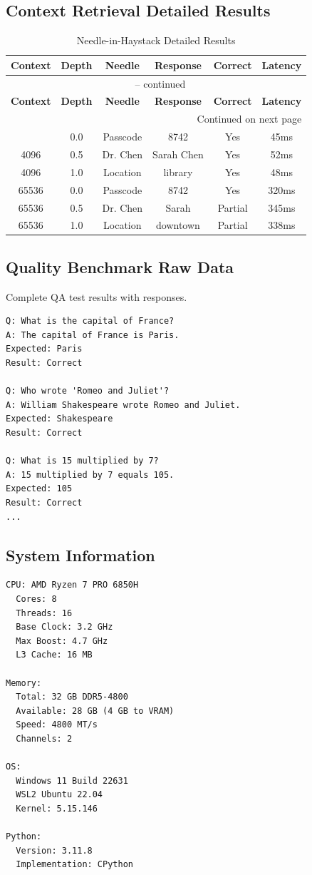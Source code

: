 \subsection{Context Retrieval Detailed Results}

\begin{longtable}{cccccc}
\caption{Needle-in-Haystack Detailed Results} \\
\toprule
\textbf{Context} & \textbf{Depth} & \textbf{Needle} & \textbf{Response} & \textbf{Correct} & \textbf{Latency} \\
\midrule
\endfirsthead
\multicolumn{6}{c}{\tablename\ \thetable{} -- continued} \\
\toprule
\textbf{Context} & \textbf{Depth} & \textbf{Needle} & \textbf{Response} & \textbf{Correct} & \textbf{Latency} \\
\midrule
\endhead
\midrule
\multicolumn{6}{r}{Continued on next page} \\
\endfoot
\bottomrule
\endlastfoot
4096 & 0.0 & Passcode & 8742 & Yes & 45ms \\
4096 & 0.5 & Dr. Chen & Sarah Chen & Yes & 52ms \\
4096 & 1.0 & Location & library & Yes & 48ms \\
65536 & 0.0 & Passcode & 8742 & Yes & 320ms \\
65536 & 0.5 & Dr. Chen & Sarah & Partial & 345ms \\
65536 & 1.0 & Location & downtown & Partial & 338ms \\
\end{longtable}

\subsection{Quality Benchmark Raw Data}

Complete QA test results with responses.

\begin{verbatim}
Q: What is the capital of France?
A: The capital of France is Paris.
Expected: Paris
Result: Correct

Q: Who wrote 'Romeo and Juliet'?
A: William Shakespeare wrote Romeo and Juliet.
Expected: Shakespeare
Result: Correct

Q: What is 15 multiplied by 7?
A: 15 multiplied by 7 equals 105.
Expected: 105
Result: Correct
...
\end{verbatim}

\subsection{System Information}

\begin{verbatim}
CPU: AMD Ryzen 7 PRO 6850H
  Cores: 8
  Threads: 16
  Base Clock: 3.2 GHz
  Max Boost: 4.7 GHz
  L3 Cache: 16 MB

Memory:
  Total: 32 GB DDR5-4800
  Available: 28 GB (4 GB to VRAM)
  Speed: 4800 MT/s
  Channels: 2

OS:
  Windows 11 Build 22631
  WSL2 Ubuntu 22.04
  Kernel: 5.15.146

Python:
  Version: 3.11.8
  Implementation: CPython
\end{verbatim}
